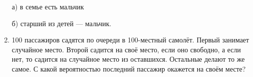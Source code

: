 \documentclass{article}
\begin{document}
\begin{enumerate}[label*=\protect\fbox{\arabic{enumi}}]
а) в семье есть мальчик 

б) старший из детей — мальчик.

\item 100 пассажиров садятся по очереди в 100-местный самолёт. Первый занимает случайное место. Второй садится на своё место, если оно свободно, а если нет, то садится на случайное место из оставшихся. Остальные делают то же самое. С какой вероятностью последний пассажир окажется на своём месте?


\end{enumerate}
\end{document}
